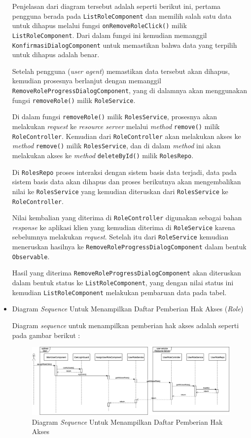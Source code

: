 \documentclass[pdftex,12pt, oneside]{article}
\begin{document}
\begin{itemize}
	Penjelasan dari diagram tersebut adalah seperti berikut ini, pertama pengguna berada pada \texttt{ListRoleComponent} dan memilih salah satu data untuk dihapus melalui fungsi \texttt{onRemoveRoleClick()} milik \texttt{ListRoleComponent}. Dari dalam fungsi ini kemudian memanggil \texttt{KonfirmasiDialogComponent} untuk memastikan bahwa data yang terpilih untuk dihapus adalah benar.
	
	Setelah pengguna (\textit{user agent}) memastikan data tersebut akan dihapus, kemudian prosesnya berlanjut dengan memanggil \texttt{RemoveRoleProgressDialogComponent}, yang di dalamnya akan menggunakan fungsi \texttt{removeRole()} milik \texttt{RoleService}.
	
	Di dalam fungsi \texttt{removeRole()} milik \texttt{RolesService}, prosesnya akan melakukan \textit{request} ke \textit{resource server} melalui \textit{method} \texttt{remove()} milik \texttt{RoleController}. Kemudian dari \texttt{RoleController} akan melakukan akses ke \textit{method} \texttt{remove()} milik \texttt{RolesService}, dan di dalam \textit{method} ini akan melakukan akses ke \textit{method} \texttt{deleteById()} milik \texttt{RolesRepo}.
	
	Di \texttt{RolesRepo} proses interaksi dengan sistem basis data terjadi, data pada sistem basis data akan dihapus dan proses berikutnya akan mengembalikan nilai ke \texttt{RolesService} yang kemudian diteruskan dari \texttt{RolesService} ke \texttt{RoleController}.
	
	Nilai kembalian yang diterima di \texttt{RoleController} digunakan sebagai bahan \textit{response} ke aplikasi klien yang kemudian diterima di \texttt{RoleService} karena sebelumnya melakukan \textit{request}. Setelah itu dari \texttt{RoleService} kemudian meneruskan hasilnya ke \texttt{RemoveRoleProgressDialogComponent} dalam bentuk \texttt{Observable}.
	
	Hasil yang diterima \texttt{RemoveRoleProgressDialogComponent} akan diteruskan dalam bentuk status ke \texttt{ListRoleComponent}, yang dengan nilai status ini kemudian \texttt{ListRoleComponent} melakukan pembaruan data pada tabel.
	
	\item Diagram \textit{Sequence} Untuk Menampilkan Daftar Pemberian Hak Akses (\textit{Role})
	
	Diagram \textit{sequence} untuk menampilkan pemberian hak akses adalah seperti pada gambar berikut :
	
	\begin{figure}[H]
		\centering
		\includegraphics[width=1\textwidth]{./resources/seq-list-user-role}
		\caption{Diagram \textit{Sequence} Untuk Menampilkan Daftar Pemberian Hak Akses}
		\label{fig:seq-list-user-role}
	\end{figure}
	

\end{itemize}
\end{document}
